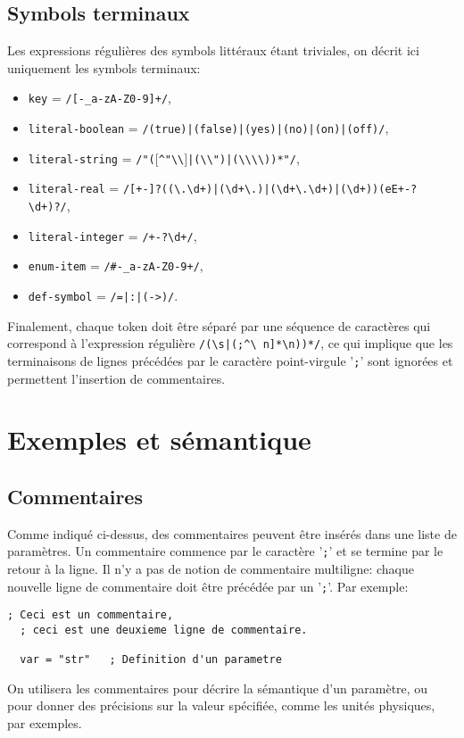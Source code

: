\subsection{Symbols terminaux}\label{sec:terminals}
Les expressions r\'eguli\`eres des symbols litt\'eraux \'etant
triviales, on d\'ecrit ici uniquement les symbols terminaux:
\begin{itemize}
\item \texttt{key} = \texttt{/[-\_a-zA-Z0-9]+/},
\item \texttt{literal-boolean} = \texttt{/(true)|(false)|(yes)|(no)|(on)|(off)/},
\item \texttt{literal-string} = \texttt{/"($\lbrack$\^{}"\textbackslash\textbackslash$\rbrack$|(\textbackslash\textbackslash")|(\textbackslash\textbackslash\textbackslash\textbackslash))*"/},
\item \texttt{literal-real} = \texttt{/[+-]?((\textbackslash.\textbackslash d+)|(\textbackslash d+\textbackslash.)|(\textbackslash d+\textbackslash.\textbackslash d+)|(\textbackslash d+))(\lbrack eE\rbrack\lbrack +-\rbrack?\textbackslash d+)?/},
\item \texttt{literal-integer} = \texttt{/\lbrack+-\rbrack?\textbackslash d+/},
\item \texttt{enum-item} = \texttt{/\#\lbrack-\_a-zA-Z0-9\rbrack+/},
\item \texttt{def-symbol} = \texttt{/=|:|(->)/}.
\end{itemize}
Finalement, chaque token doit \^etre s\'epar\'e par une s\'equence de
caract\`eres qui correspond \`a l'expression r\'eguli\`ere
\texttt{/(\textbackslash s|(;\lbrack\^{}\textbackslash%
n]*\textbackslash n))*/}, ce qui implique que les terminaisons de
lignes pr\'ec\'ed\'ees par le caract\`ere point-virgule '\texttt{;}'
sont ignor\'ees et permettent l'insertion de commentaires.


\section{Exemples et s\'emantique}\label{sec:semantic}

\subsection{Commentaires}
Comme indiqu\'e ci-dessus, des commentaires peuvent \^etre ins\'er\'es
dans une liste de param\`etres. Un commentaire commence par le
caract\`ere '\texttt{;}' et se termine par le retour \`a la ligne. Il
n'y a pas de notion de commentaire multiligne: chaque nouvelle ligne
de commentaire doit \^etre pr\'ec\'ed\'ee par un '\texttt{;}'. Par
exemple:
\begin{lstlisting}[language={},frame=single,basicstyle=\ttfamily]
  ; Ceci est un commentaire,
  ; ceci est une deuxieme ligne de commentaire.
  
  var = "str"   ; Definition d'un parametre
\end{lstlisting}
On utilisera les commentaires pour d\'ecrire la s\'emantique d'un
param\`etre, ou pour donner des pr\'ecisions sur la valeur
sp\'ecifi\'ee, comme les unit\'es physiques, par exemples.

